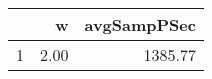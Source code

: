 \begin{table}[h]
\centering
\begin{tabular}{rrr}
  \hline
 & w & avgSampPSec \\ 
  \hline
1 & 2.00 & 1385.77 \\ 
   \hline
\end{tabular}
\end{table}
